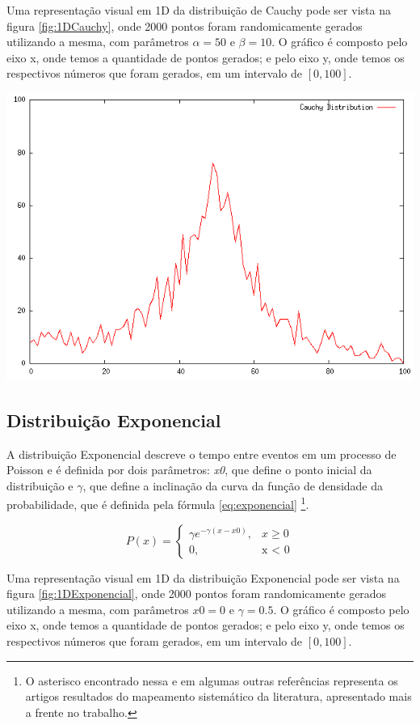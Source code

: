 Uma representação visual em 1D da distribuição de Cauchy pode ser vista na figura \ref{fig:1DCauchy}, onde 2000 pontos foram randomicamente gerados utilizando a mesma, com parâmetros $\alpha = 50$ e $\beta = 10$. O gráfico é composto pelo eixo x, onde temos a quantidade de pontos gerados; e pelo eixo y, onde temos os respectivos números que foram gerados, em um intervalo de $[0, 100]$.

{
    \centering
    \includegraphics[width=0.6\linewidth]{figuras/DistribuicaoCauchy.png}
    \label{fig:1DCauchy}
}

\subsection{Distribuição Exponencial}

A distribuição Exponencial descreve o tempo entre eventos em um processo de Poisson e é definida por dois parâmetros: \textit{x0}, que define o ponto inicial da distribuição e $\gamma$, que define a inclinação da curva da função de densidade da probabilidade, que é definida pela fórmula \ref{eq:exponencial} \cite{yu} \footnote{O asterisco encontrado nessa e em algumas outras referências representa os artigos resultados do mapeamento sistemático da literatura, apresentado mais a frente no trabalho.}.

\begin{equation}
\label{eq:exponencial}
P(x) = 
\begin{cases}
    \gamma e^{-\gamma(x-x0)},    & \text{$x \geq 0$}\\
    0, & \text{x < 0}
\end{cases}
\end{equation}

Uma representação visual em 1D da distribuição Exponencial pode ser vista na figura \ref{fig:1DExponencial}, onde 2000 pontos foram randomicamente gerados utilizando a mesma, com parâmetros $x0 = 0$ e $\gamma = 0.5$. O gráfico é composto pelo eixo x, onde temos a quantidade de pontos gerados; e pelo eixo y, onde temos os respectivos números que foram gerados, em um intervalo de $[0, 100]$.

